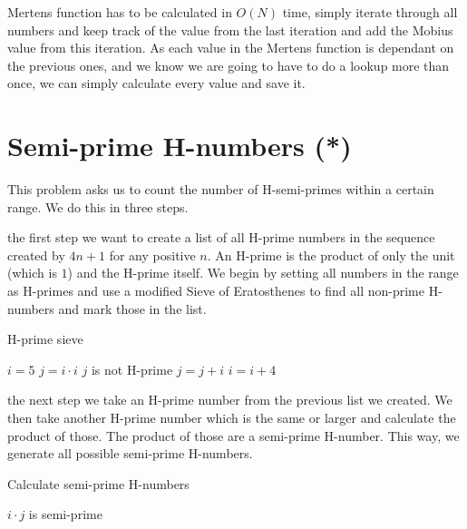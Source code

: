 \documentclass[11pt,a4paper,twoside]{article}
\begin{document}
 Mertens function has to be calculated in $O(N)$ time, simply
iterate through all numbers and keep track of the value from the last iteration
and add the Mobius value from this iteration. As each value in the Mertens
function is dependant on the previous ones, and we know we are going to have to
do a lookup more than once, we can simply calculate every value and save it.


\section{Semi-prime H-numbers (*)}

This problem asks us to count the number of H-semi-primes within a certain 
range. We do this in three steps.

 the first step we want to create a list of all H-prime numbers in
the sequence created by $4n + 1$ for any positive $n$. An H-prime is the
product of only the unit (which is $1$) and the H-prime itself. We begin by
setting all numbers in the range as H-primes and use a modified Sieve of
Eratosthenes to find all non-prime H-numbers and mark those in the list.

\begin{algorithm}
    \caption{H-prime sieve}
    \label{lst:hsieve}
    \begin{algorithmic}
        \STATE $i = 5$
                \STATE $j = i \cdot i$
                    \STATE $j$ is not H-prime %
                    \STATE $j = j + i$
                \ENDWHILE
            \ENDIF
            \STATE $i = i + 4$
        \ENDWHILE
    \end{algorithmic}
\end{algorithm}

 the next step we take an H-prime number from the previous list we
created. We then take another H-prime number which is the same or larger and
calculate the product of those. The product of those are a semi-prime H-number.
This way, we generate all possible semi-prime H-numbers.

\begin{algorithm}
    \caption{Calculate semi-prime H-numbers}
    \label{Semi-prime H-numbers}
    \begin{algorithmic}
                \STATE $i \cdot j$ is semi-prime
            \ENDFOR
        \ENDFOR
    \end{algorithmic}
\end{algorithm}
\end{document}
